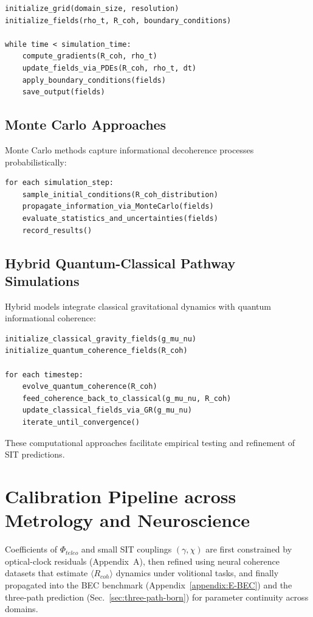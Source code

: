 \documentclass[american,11pt,letterpaper]{article}
\def\mathrm#1{#1}%
\begin{document}
\begin{verbatim}
initialize_grid(domain_size, resolution)
initialize_fields(rho_t, R_coh, boundary_conditions)

while time < simulation_time:
    compute_gradients(R_coh, rho_t)
    update_fields_via_PDEs(R_coh, rho_t, dt)
    apply_boundary_conditions(fields)
    save_output(fields)
\end{verbatim}

\subsection{Monte Carlo Approaches}

Monte Carlo methods capture informational decoherence processes probabilistically:

\begin{verbatim}
for each simulation_step:
    sample_initial_conditions(R_coh_distribution)
    propagate_information_via_MonteCarlo(fields)
    evaluate_statistics_and_uncertainties(fields)
    record_results()
\end{verbatim}

\subsection{Hybrid Quantum-Classical Pathway Simulations}

Hybrid models integrate classical gravitational dynamics with quantum informational coherence:

\begin{verbatim}
initialize_classical_gravity_fields(g_mu_nu)
initialize_quantum_coherence_fields(R_coh)

for each timestep:
    evolve_quantum_coherence(R_coh)
    feed_coherence_back_to_classical(g_mu_nu, R_coh)
    update_classical_fields_via_GR(g_mu_nu)
    iterate_until_convergence()
\end{verbatim}

These computational approaches facilitate empirical testing and refinement of SIT predictions.

\section{Calibration Pipeline across Metrology and Neuroscience}
\label{sec:calibration-pipeline}
Coefficients of $\Phi_{\mathrm{teleo}}$ and small SIT couplings $(\gamma,\chi)$ are first constrained by optical-clock residuals (Appendix~A), then refined using neural coherence datasets that estimate $\langle R_{\mathrm{coh}}\rangle$ dynamics under volitional tasks, and finally propagated into the BEC benchmark (Appendix~\ref{appendix:E-BEC}) and the three-path prediction (Sec.~\ref{sec:three-path-born}) for parameter continuity across domains.
\end{document}
